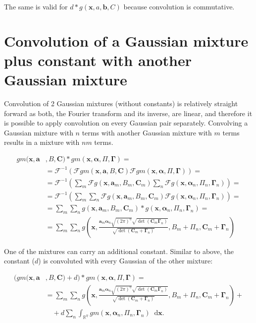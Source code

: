 \documentclass{paper}
\newcommand{\F}{\ensuremath{\mathcal{F}}}
\newcommand{\vr}[1]{\ensuremath{\boldsymbol{#1}}}
\newcommand{\tr}[1]{\ensuremath{\boldsymbol{#1}}}
\newcommand{\f}[1]{#1}
\newcommand*\diff{\mathop{}\!\mathrm{d}}
\newcommand{\alphavec}[0]{\ensuremath{\vr{\alpha{}}}}
\newcommand{\avec}[0]{\ensuremath{\vr{a}}}
\newcommand{\bvec}[0]{\ensuremath{\vr{b}}}
\newcommand{\xvec}[0]{\ensuremath{\vr{x}}}
\newcommand{\Ctns}[0]{\ensuremath{\tr{C}}}
\newcommand{\Gammatns}[0]{\ensuremath{\tr{\Gamma}}}
\begin{document}
The same is valid for $d \ast g(\xvec, a, \bvec, C)$ because convolution is commutative.

\section{Convolution of a Gaussian mixture plus constant with another Gaussian mixture}
Convolution of 2 Gaussian mixtures (without constants) is relatively straight forward as both, the Fourier transform and its inverse, are linear, and therefore it is possible to apply convolution on every Gaussian pair separately.
Convolving a Gaussian mixture with $n$ terms with another Gaussian mixture with $m$ terms results in a mixture with $nm$ terms.

\begin{align*}
	\f{gm}(\xvec, \avec&, B, \Ctns) \ast \f{gm}(\xvec, \alphavec, \Pi, \Gammatns) = \\
	&= \F^{-1}\left(\F\f{gm}(\xvec, \avec, B, \Ctns) \F\f{gm}(\xvec, \alphavec, \Pi, \Gammatns)\right) = \\
	&= \F^{-1}\left(\sum_{m}\F g(\xvec, \avec_m, B_{m}, \Ctns_{m}) \sum_n \F g(\xvec, \alphavec_n, \Pi_{n}, \Gammatns_{n})\right) = \\
	&= \F^{-1}\left(\sum_{m}\sum_n  \F g(\xvec, \avec_m, B_{m}, \Ctns_{m}) \F g(\xvec, \alphavec_n, \Pi_{n}, \Gammatns_{n})\right) = \\
	&= \sum_{m}\sum_n g(\xvec, \avec_m, B_{m}, \Ctns_{m}) \ast g(\xvec, \alphavec_n, \Pi_{n}, \Gammatns_{n}) = \\
	&= \sum_{m}\sum_n g\left(\xvec, \frac{\avec_m \alphavec_n \sqrt{(2 \pi)^\eta} \sqrt{\det(\Ctns_{m}\Gammatns_{n})}}{\sqrt{\det(\Ctns_{m}+\Gammatns_{n})}}, B_{m} + \Pi_{n}, \Ctns_{m} + \Gammatns_{n}\right)
\end{align*}

One of the mixtures can carry an additional constant.
Similar to above, the constant ($d$) is convoluted with every Gaussian of the other mixture:

\begin{align*}
\Big( \f{gm}(\xvec, \avec&, B, \Ctns) + d \Big)  \ast \f{gm}(\xvec, \alphavec, \Pi, \Gammatns) = \\
&= \sum_{m}\sum_n g\left(\xvec, \frac{\avec_m \alphavec_n \sqrt{(2 \pi)^\eta} \sqrt{\det(\Ctns_{m}\Gammatns_{n})}}{\sqrt{\det(\Ctns_{m}+\Gammatns_{n})}}, B_{m} + \Pi_{n}, \Ctns_{m} +
\Gammatns_{n}\right) + \\
&\quad + d \sum_n \int_{\mathbb{R}^\eta} \f{gm}(\xvec, \alphavec_n, \Pi_n, \Gammatns_n) \diff \xvec.
\end{align*}
\end{document}
